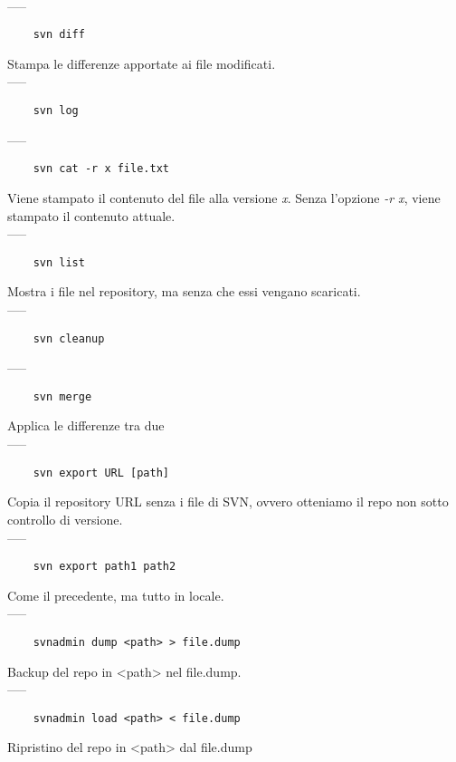 \documentclass[a4paper]{article}
\begin{document}
	\\-----
	\begin{verbatim}
	svn diff
	\end{verbatim}
	Stampa le differenze apportate ai file modificati.\\-----
	\begin{verbatim}
	svn log
	\end{verbatim}
	-----
	\begin{verbatim}
	svn cat -r x file.txt 
	\end{verbatim}
	Viene stampato il contenuto del file alla versione \textit{x}. Senza l'opzione \textit{-r x}, viene stampato il contenuto attuale.\\-----
	\begin{verbatim}
	svn list
	\end{verbatim}
	Mostra i file nel repository, ma senza che essi vengano scaricati.\\-----
	\begin{verbatim}
	svn cleanup
	\end{verbatim}
	-----
	\begin{verbatim}
	svn merge
	\end{verbatim}
	Applica le differenze tra due\\-----
	\begin{verbatim}
	svn export URL [path]
	\end{verbatim}
	Copia il repository URL senza i file di SVN, ovvero otteniamo il repo non sotto controllo di versione.\\-----
	\begin{verbatim}
	svn export path1 path2
	\end{verbatim}
	Come il precedente, ma tutto in locale.\\-----
	\begin{verbatim}
	svnadmin dump <path> > file.dump
	\end{verbatim}
	Backup del repo in <path> nel file.dump.\\-----
	\begin{verbatim}
	svnadmin load <path> < file.dump
	\end{verbatim}
	Ripristino del repo in <path> dal file.dump
	
	
\end{document}
